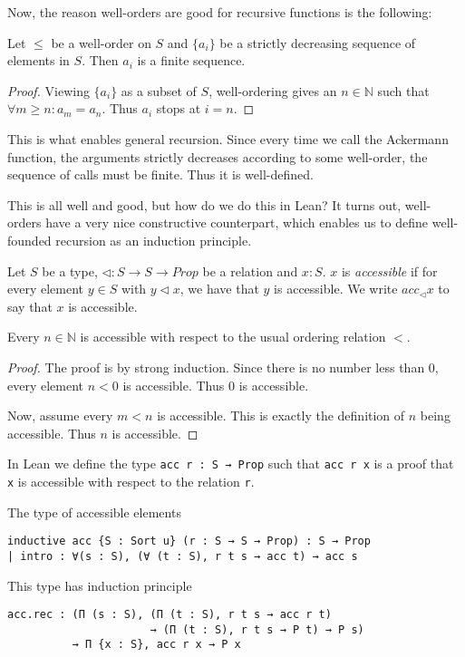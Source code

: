\documentclass[a4paper, 12pt]{article}
\newcommand{\N}{\mathbb{N}}
\newcommand{\Prop}{\mathit{Prop}}
\renewcommand{\Prop}{\mathit{Prop}}
\newcommand{\lean}[1]{\texttt{#1}}
\theoremstyle{changedot}
\theoremstyle{changedotbreak}
\theoremstyle{nonumberplain}
\newtheorem{proof}{Proof}
\begin{document}
Now, the reason well-orders are good for recursive functions is the following:

\begin{proposition}
  Let $\leq$ be a well-order on $S$ and $\{a_{i}\}$ be a strictly decreasing sequence of elements in $S$. Then $a_{i}$ is a finite sequence. 
\end{proposition}
\begin{proof}
  Viewing $\{a_{i}\}$ as a subset of $S$, well-ordering gives an $n \in \N$ such that $\forall m \geq n: a_{m} = a_{n}$. Thus $a_{i}$ stops at $i = n$.
\end{proof}

This is what enables general recursion. Since every time we call the Ackermann function, the arguments strictly decreases according to some well-order, the sequence of calls must be finite. Thus it is well-defined.

This is all well and good, but how do we do this in Lean? It turns out, well-orders have a very nice constructive counterpart, which enables us to define well-founded recursion as an induction principle.

\begin{definition}
  Let $S$ be a type, $\lhd : S \to S \to \Prop$ be a relation and $x : S$. $x$ is \textit{accessible} if for every element $y \in S$ with $y \lhd x$, we have that $y$ is accessible. We write $acc_{\lhd} x$ to say that $x$ is accessible.
\end{definition}

\begin{proposition}
  Every $n \in \N$ is accessible with respect to the usual ordering relation $<$.
\end{proposition}
\begin{proof}
  The proof is by strong induction. Since there is no number less than $0$, every element $n < 0$ is accessible. Thus $0$ is accessible.

  Now, assume every $m < n$ is accessible. This is exactly the definition of $n$ being accessible. Thus $n$ is accessible.
\end{proof}

In Lean we define the type \lean{acc r : S → Prop} such that \lean{acc r x} is a proof that \lean{x} is accessible with respect to the relation \lean{r}.

\begin{definition}
  The type of accessible elements
\begin{verbatim}
inductive acc {S : Sort u} (r : S → S → Prop) : S → Prop
| intro : ∀(s : S), (∀ (t : S), r t s → acc t) → acc s
\end{verbatim}

  This type has induction principle

\begin{verbatim}
acc.rec : (Π (s : S), (Π (t : S), r t s → acc r t)
                      → (Π (t : S), r t s → P t) → P s)
          → Π {x : S}, acc r x → P x
\end{verbatim}
\end{definition}
\end{document}

